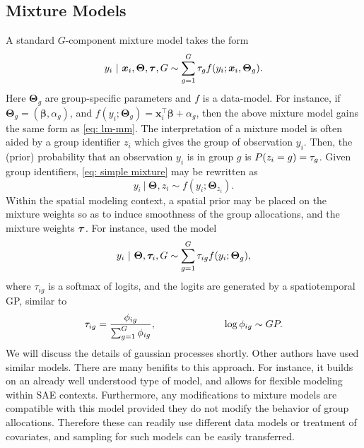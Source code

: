 \documentclass[twoside,12pt,bibstyle=chem-acs]{reedthesis}
\begin{document}
\subsection{Mixture Models}
A standard $G$-component mixture model takes the form
\begin{equation}
y_i ~|~ \bm{x}_i, \bm\Theta, \bm{\tau}, G \sim \sum_{g=1}^G \tau_g f(y_i; \bm{x}_i, \bm\Theta_g).
\label{eq: simple mixture}
\end{equation}
Here $\bm\Theta_g$ are group-specific parameters and $f$ is a data-model. For instance, if $\bm\Theta_g = (\bm\beta, \alpha_g)$, and $f(y_i; \bm\Theta_g) = \bm{x}_i^\top \bm\beta + \alpha_g$, then the above mixture model gains the same form as \autoref{eq: lm-mm}. The interpretation of a mixture model is often aided by a group identifier $z_i$ which gives the group of observation $y_i$. Then, the (prior) probability that an observation $y_i$ is in group $g$ is $P(z_i = g) = \tau_g$. Given group identifiers, \autoref{eq: simple mixture} may be rewritten as
\begin{equation*}
y_i ~|~ \bm\Theta, z_i \sim f(y_i; \bm\Theta_{z_i}).
\end{equation*}
Within the spatial modeling context, a spatial prior may be placed on the mixture weights so as to induce smoothness of the group allocations, and the mixture weights $\bm{\tau}$. For instance, \citeauthor{vanhatalo_spatiotemporal_2021} used the model
\begin{equation*}
y_i ~|~ \bm\Theta, \bm{\tau}_i, G \sim \sum_{g=1}^G \tau_{ig} f(y_i; \bm\Theta_g),
\end{equation*}
where $\tau_{ig}$ is a softmax of logits, and the logits are generated by a spatiotemporal GP, similar to
\begin{equation}
\mix_{ig} = \frac{\phi_{ig}}{\sum_{g=1}^G \phi_{ig}}, \hspace{0.2\linewidth} \log\phi_{ig} \sim GP.
\end{equation}
We will discuss the details of gaussian processes shortly.
Other authors \cite{cheam_modelbased_2017,povala_burglary_2020,fernandez_modelling_2002} have used similar models. There are many benifits to this approach. For instance, it builds on an already well understood type of model, and allows for flexible modeling within SAE contexts. Furthermore, any modifications to mixture models are compatible with this model provided they do not modify the behavior of group allocations. Therefore these can readily use different data models or treatment of covariates, and sampling for such models can be easily transferred.
\end{document}
